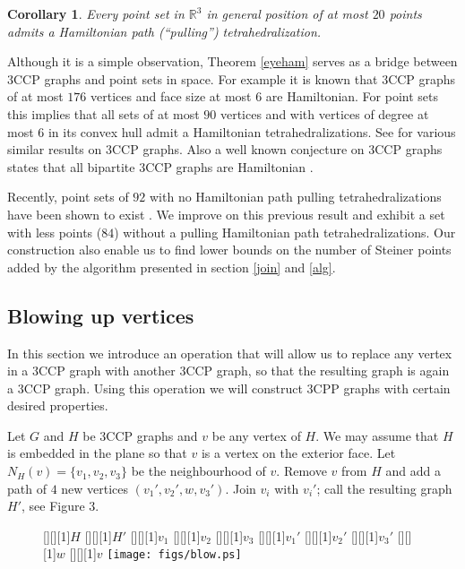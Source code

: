 \documentclass{article}
\newtheorem{cor}[theorem]{Corollary}
\begin{document}
\begin{cor}\label{corol}
Every point set in $\mathbb{R}^3$ in general position of at most
$20$ points admits a Hamiltonian path (``pulling'') tetrahedralization.
\end{cor}

Although it is a simple observation, Theorem \ref{eyeham} serves as a bridge
between $3$CCP graphs and point sets in space. For example it is known that 
$3$CCP graphs of at most $176$ vertices and face size at most $6$ are Hamiltonian.
For point sets this implies that all sets of at most $90$ vertices and with vertices
of degree at most $6$ in its convex hull admit a Hamiltonian tetrahedralizations.
See \cite{mckay} for various similar results on $3$CCP graphs. Also a well known conjecture on $3$CCP graphs states that all bipartite $3$CCP
graphs are Hamiltonian \cite{barnette}.\par

Recently, point sets of $92$ with no Hamiltonian path pulling tetrahedralizations have 
been shown to exist \cite{isora}. We improve on this previous result
and exhibit a set with less points ($84$) without a pulling Hamiltonian
path tetrahedralizations.
Our construction also enable us to find lower bounds on the number of Steiner 
points added by the algorithm presented in section \ref{join} and \ref{alg}.\par

\subsection{Blowing up vertices}

In this section we introduce an operation that will allow us to replace any vertex in a $3$CCP graph
with another $3$CCP graph, so that the resulting graph is again a $3$CCP graph.
Using this operation we will construct $3$CPP graphs with certain desired properties.\par

Let $G$ and $H$ be $3$CCP graphs and $v$ be any vertex of $H$.
We may assume that $H$ is embedded in the plane so that $v$ is a vertex on the exterior face.
Let $N_H(v)=\{v_1,v_2, v_3\}$ be the neighbourhood of $v$. Remove $v$ from 
$H$ and add a path of $4$ new vertices $(v_1',v_2',w,v_3')$. Join $v_i$ with $v_i'$; 
call the resulting graph $H'$, see Figure 3.\par

\begin{figure} \label{con3ccp}
  \begin{center}
    [][][1]{$H$}
    [][][1]{$H'$}
    [][][1]{$v_1$}
    [][][1]{$v_2$}
    [][][1]{$v_3$}
    [][][1]{$v_1'$}
    [][][1]{$v_2'$}
    [][][1]{$v_3'$}
    [][][1]{$w$}
    [][][1]{$v$}
    \texttt{[image: figs/blow.ps]}
  \end{center}
    \caption{}
\end{figure}
\end{document}
